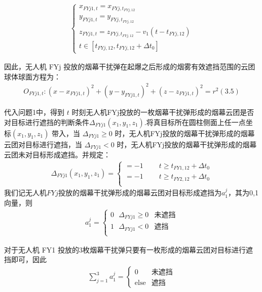 \documentclass[../main.tex]{subfiles}
\begin{document}
\begin{itemize}
\begin{align}
	\left\{ \begin{array}{l}
	x_{FYj1,t}=x_{FYj,t_{FYj,12}}\\
	y_{FYj1,t}=y_{FYj,t_{FYj,12}}\\
	z_{FYj1,t}=z_{FYj,t_{FYj,12}}-v_1\left( t-t_{FYj,12} \right)\\
	t\in \left[ t_{FYj,12},t_{FYj,12}+\Delta t_0 \right]
\end{array} \right.
\end{align}
\par 因此，无人机 FYj 投放的烟幕干扰弹在起爆之后形成的烟雾有效遮挡范围的云团球体球面方程为：
\begin{align}
	O_{FYj1,t}:\left( x-x_{FYj1,t} \right) ^2+\left( y-y_{FYj1,t} \right) ^2+\left( z-z_{FYj1,t} \right) ^2=r^2\left( 3.5 \right) 
\end{align}
\par 代入问题1中，得到 $t$ 时刻无人机FYj投放的一枚烟幕干扰弹形成的烟幕云团是否对目标进行遮挡的判断条件$\Delta _{FYj1}\left( x_1,y_1,z_1 \right) $.将真目标所在圆柱侧面上任一点坐标$(x_1, y_1, z_1)$ 带入，当 $\Delta _{FYj1} \geq 0$ 时，无人机FYj投放的烟幕干扰弹形成的烟幕云团对目标进行遮挡，当 $\Delta _{FYj1} < 0$ 时，无人机FYj投放的烟幕干扰弹形成的烟幕云团未对目标形成遮挡。并规定： 
\begin{align}\label{14.9}
	\Delta _{FYj1}\left( x_1,y_1,z_1 \right) =\left\{ \begin{array}{l}
	=-1\ \ \ \ \ \ \ \ \ \ t\ge t_{FY1,12}+\Delta t_0\\
	=-1\ \ \ \ \ \ \ \ \ \ t\ge t_{FY2,12}+\Delta t_0\\
\end{array} \right.
\end{align}
我们记无人机$FYj$投放的烟幕干扰弹形成的烟幕云团对目标形成遮挡为$a_{1}^{j}$，其为0,1向量，则
\begin{align}
a_{1}^{j}=\begin{cases}
	0\ \ \ \Delta _{FYj1}\geq 0&		\text{未遮挡}\\
	1\ \ \ \Delta _{FYj1}<0&		\text{遮挡}\\
\end{cases}
\end{align}\label{19.7}
\par 对于无人机 FY1 投放的3枚烟幕干扰弹只要有一枚形成的烟幕云团对目标进行遮挡即可，因此
\begin{align}
\sum_{j=1}^{3} a_{1}^{j} = 
\begin{cases} 
0 & \text{未遮挡} \\
\text{else} & \text{遮挡}
\end{cases}
\end{align}




\end{itemize}
\end{document}
